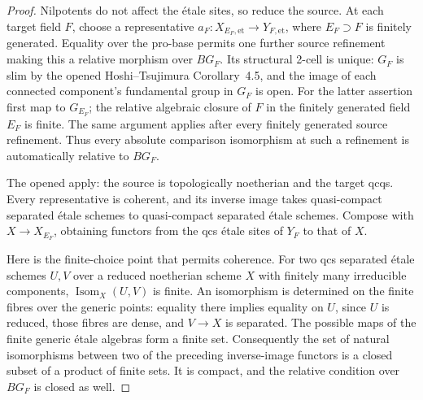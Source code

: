 \begin{proof}
Nilpotents do not affect the étale sites, so reduce the source.
At each target field \(F\), choose a representative
\(a_F:X_{E_F,\mathrm{et}}\to Y_{F,\mathrm{et}}\), where
\(E_F\supset F\) is finitely generated. Equality over the pro-base
permits one further source refinement making this a relative
morphism over \(BG_F\). Its structural 2-cell is unique:
\(G_F\) is slim by the opened Hoshi--Tsujimura Corollary~4.5,
and the image of each connected component's fundamental group in
\(G_F\) is open. For the latter assertion first map to \(G_{E_F}\);
the relative algebraic closure of \(F\) in the finitely generated
field \(E_F\) is finite. The same argument applies after every
finitely generated source refinement. Thus every absolute
comparison isomorphism at such a refinement is automatically
relative to \(BG_F\).

The opened \citep[Theorem~A.8 and Corollary~A.9]{CarlsonHaineWolf2024}
apply: the source is topologically noetherian and the target qcqs.
Every representative is coherent, and its inverse image takes
quasi-compact separated étale schemes to quasi-compact separated
étale schemes. Compose with \(X\to X_{E_F}\), obtaining functors
from the qcs étale sites of \(Y_F\) to that of \(X\).

Here is the finite-choice point that permits coherence. For two
qcs separated étale schemes \(U,V\) over a reduced noetherian
scheme \(X\) with finitely many irreducible components,
\(\operatorname{Isom}_X(U,V)\) is finite. An isomorphism is
determined on the finite fibres over the generic points: equality
there implies equality on \(U\), since \(U\) is reduced, those
fibres are dense, and \(V\to X\) is separated. The possible maps
of the finite generic étale algebras form a finite set.
Consequently the set of natural isomorphisms between two of the
preceding inverse-image functors is a closed subset of a product
of finite sets. It is compact, and the relative condition over
\(BG_F\) is closed as well.


\end{proof}
